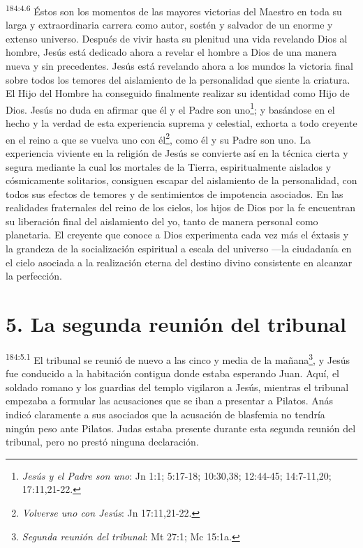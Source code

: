 \par
\textsuperscript{184:4.6} Éstos son los momentos de las mayores victorias del Maestro en toda su larga y extraordinaria carrera como autor, sostén y salvador de un enorme y extenso universo. Después de vivir hasta su plenitud una vida revelando Dios al hombre, Jesús está dedicado ahora a revelar el hombre a Dios de una manera nueva y sin precedentes. Jesús está revelando ahora a los mundos la victoria final sobre todos los temores del aislamiento de la personalidad que siente la criatura. El Hijo del Hombre ha conseguido finalmente realizar su identidad como Hijo de Dios. Jesús no duda en afirmar que él y el Padre son uno\footnote{\textit{Jesús y el Padre son uno}: Jn 1:1; 5:17-18; 10:30,38; 12:44-45; 14:7-11,20; 17:11,21-22.}; y basándose en el hecho y la verdad de esta experiencia suprema y celestial, exhorta a todo creyente en el reino a que se vuelva uno con él\footnote{\textit{Volverse uno con Jesús}: Jn 17:11,21-22.}, como él y su Padre son uno. La experiencia viviente en la religión de Jesús se convierte así en la técnica cierta y segura mediante la cual los mortales de la Tierra, espiritualmente aislados y cósmicamente solitarios, consiguen escapar del aislamiento de la personalidad, con todos sus efectos de temores y de sentimientos de impotencia asociados. En las realidades fraternales del reino de los cielos, los hijos de Dios por la fe encuentran su liberación final del aislamiento del yo, tanto de manera personal como planetaria. El creyente que conoce a Dios experimenta cada vez más el éxtasis y la grandeza de la socialización espiritual a escala del universo ---la ciudadanía en el cielo asociada a la realización eterna del destino divino consistente en alcanzar la perfección.

\section*{5. La segunda reunión del tribunal}
\par
\textsuperscript{184:5.1} El tribunal se reunió de nuevo a las cinco y media de la mañana\footnote{\textit{Segunda reunión del tribunal}: Mt 27:1; Mc 15:1a.}, y Jesús fue conducido a la habitación contigua donde estaba esperando Juan. Aquí, el soldado romano y los guardias del templo vigilaron a Jesús, mientras el tribunal empezaba a formular las acusaciones que se iban a presentar a Pilatos. Anás indicó claramente a sus asociados que la acusación de blasfemia no tendría ningún peso ante Pilatos. Judas estaba presente durante esta segunda reunión del tribunal, pero no prestó ninguna declaración.

